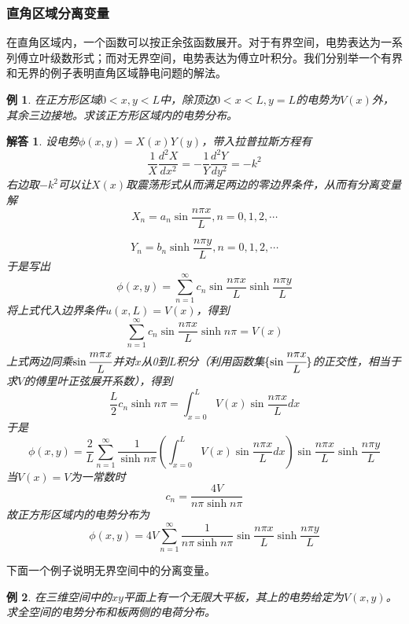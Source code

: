 \documentclass[a4paper,11pt]{ctexart}
\newtheorem{eg}{例}[section]
\newtheorem{ans}{解答}[section]
\newcommand{\beq}{\begin{equation}}
\newcommand{\eeq}{\end{equation}}
\begin{document}
\subsubsection{直角区域分离变量}
在直角区域内，一个函数可以按正余弦函数展开。对于有界空间，电势表达为一系列傅立叶级数形式；而对无界空间，电势表达为傅立叶积分。我们分别举一个有界和无界的例子表明直角区域静电问题的解法。\begin{eg}
在正方形区域$0<x,y<L$中，除顶边$0<x<L, y=L$的电势为$V(x)$外，其余三边接地。求该正方形区域内的电势分布。
\end{eg}
\begin{ans}
设电势$\phi( x,y) = X(x) Y(y)$，带入拉普拉斯方程有
\beq
\frac{1}{X} \frac{d^2 X}{d x^2} = - \frac{1}{Y} \frac{d^2 Y}{dy^2} = -k^2
\eeq
右边取$-k^2$可以让$X(x)$取震荡形式从而满足两边的零边界条件，从而有分离变量解
\begin{equation}
X_n = a_n \sin \frac{n\pi x}{L}, n=0,1,2,\cdots
\end{equation}

\begin{equation}
Y_n = b_n \sinh \frac{n\pi y}{L}, n=0,1,2,\cdots
\end{equation}
于是写出
\begin{equation}
\phi(x,y) = \sum_{n=1}^\infty c_n \sin \frac{n\pi x}{L} \sinh \frac{n\pi y}{L}
\end{equation}
将上式代入边界条件$u(x,L) =V(x)$，得到
\begin{equation}
\sum_{n=1}^\infty c_n \sin \frac{n\pi x}{L} \sinh n\pi = V(x)
\end{equation}
上式两边同乘$\sin \cfrac{m\pi x}{L}$并对$x$从0到$L$积分（利用函数集$\{ \sin \cfrac{n \pi x}{L}\}$的正交性，相当于求$V$的傅里叶正弦展开系数），得到
\beq
\frac{L}{2}  c_n \sinh n \pi=  \int_{x=0}^L V(x) \sin \frac{n \pi x}{L} dx
\eeq
于是
\beq
\phi(x,y) = \frac{2}{L} \sum_{n=1}^\infty \frac{1}{\sinh n \pi}  \left( \int_{x=0}^L V(x) \sin \frac{n \pi x}{L} dx \right)
\sin \frac{n\pi x}{L} \sinh \frac{n\pi y }{L}
\eeq
当$V(x)=V$为一常数时
\begin{equation}
c_n = \frac{4V}{n\pi \sinh n \pi} \end{equation}
故正方形区域内的电势分布为
\begin{equation}
\phi(x,y) = 4V\sum_{n=1}^{\infty} \frac{1}{n\pi \sinh n \pi}  \sin \frac{n\pi x}{L} \sinh \frac{n\pi y}{L}
\end{equation}
\end{ans}
\par
下面一个例子说明无界空间中的分离变量。
\begin{eg}
在三维空间中的$xy$平面上有一个无限大平板，其上的电势给定为$V(x,y)$。求全空间的电势分布和板两侧的电荷分布。
\end{eg}
\end{document}

